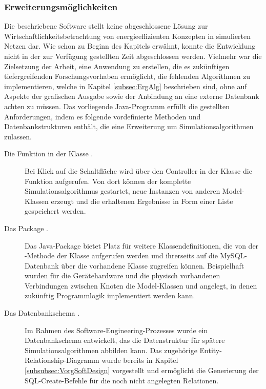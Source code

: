 \subsubsection{Erweiterungsmöglichkeiten} \label{subsubsec:ErgSoftwErweiterung}
Die beschriebene Software stellt keine abgeschlossene Lösung zur Wirtschaftlichkeitsbetrachtung von energieeffizienten Konzepten in simulierten Netzen dar. Wie schon zu Beginn des Kapitels erwähnt, konnte die Entwicklung nicht in der zur Verfügung gestellten Zeit abgeschlossen werden. Vielmehr war die Zielsetzung der Arbeit, eine Anwendung zu erstellen, die es zukünftigen tiefergreifenden Forschungsvorhaben ermöglicht, die fehlenden Algorithmen zu implementieren, welche in Kapitel \ref{subsec:ErgAlg} beschrieben sind, ohne auf Aspekte der grafischen Ausgabe sowie der Anbindung an eine externe Datenbank achten zu müssen.
Das vorliegende Java-Programm erfüllt die gestellten Anforderungen, indem es folgende vordefinierte Methoden und Datenbankstrukturen enthält, die eine Erweiterung um Simulationsalgorithmen zulassen.

\begin{description}
\item [Die Funktion  in der Klasse .] Bei Klick auf die Schalt\-flä\-che  wird über den Controller in der Klasse  die Funktion  aufgerufen. Von dort können der komplette Simulationsalgorithmus gestartet, neue Instanzen von anderen Model-Klassen erzeugt und die erhaltenen Ergebnisse in Form einer Liste gespeichert werden.
\item [Das Package .] Das Java-Package  bietet Platz für weitere Klassendefinitionen, die von der -Methode der Klasse  aufgerufen werden und ihrerseits auf die MySQL-Datenbank über die vorhandene Klasse  zugreifen können. Beispielhaft wurden für die Gerätehardware und die physisch vorhandenen Verbindungen zwischen Knoten die Model-Klassen  und  angelegt, in denen zukünftig Programmlogik implementiert werden kann.
\item [Das Datenbankschema .] Im Rahmen des Soft\-ware-Engi\-neering-Pro\-zess\-es wurde ein Datenbankschema entwickelt, das die Datenstruktur für spätere Simulationsalgorithmen abbilden kann. Das zugehörige Enti\-ty-Re\-lation\-ship-Dia\-gramm wurde bereits in Kapitel \ref{subsubsec:VorgSoftDesign} vorgestellt und ermöglicht die Generierung der SQL-Create-Befehle für die noch nicht angelegten Relationen.
\end{description}

